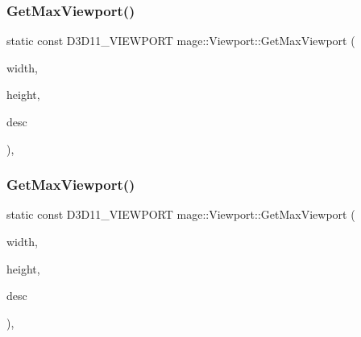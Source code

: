 \subsubsection{\texorpdfstring{Get\+Max\+Viewport()}{GetMaxViewport()}\hspace{0.1cm}{\footnotesize\ttfamily [4/5]}}
{\footnotesize\ttfamily static const D3\+D11\+\_\+\+V\+I\+E\+W\+P\+O\+RT mage\+::\+Viewport\+::\+Get\+Max\+Viewport (\begin{DoxyParamCaption}\item[{\hyperlink{namespacemage_a41c104c036fba3756a74e19f793eeaa1}{U32}}]{width,  }\item[{\hyperlink{namespacemage_a41c104c036fba3756a74e19f793eeaa1}{U32}}]{height,  }\item[{\hyperlink{namespacemage_a0b400065340fa5cca0ce4c2809d91af1}{A\+A\+Descriptor}}]{desc }\end{DoxyParamCaption})\hspace{0.3cm}{\ttfamily [static]}, {\ttfamily [noexcept]}}

\hypertarget{classmage_1_1_viewport_aa217e71e22be17179f6e1e9e18b30b77}{}\label{classmage_1_1_viewport_aa217e71e22be17179f6e1e9e18b30b77} 
\subsubsection{\texorpdfstring{Get\+Max\+Viewport()}{GetMaxViewport()}\hspace{0.1cm}{\footnotesize\ttfamily [5/5]}}
{\footnotesize\ttfamily static const D3\+D11\+\_\+\+V\+I\+E\+W\+P\+O\+RT mage\+::\+Viewport\+::\+Get\+Max\+Viewport (\begin{DoxyParamCaption}\item[{\hyperlink{namespacemage_aa97e833b45f06d60a0a9c4fc22ae02c0}{F32}}]{width,  }\item[{\hyperlink{namespacemage_aa97e833b45f06d60a0a9c4fc22ae02c0}{F32}}]{height,  }\item[{\hyperlink{namespacemage_a0b400065340fa5cca0ce4c2809d91af1}{A\+A\+Descriptor}}]{desc }\end{DoxyParamCaption})\hspace{0.3cm}{\ttfamily [static]}, {\ttfamily [noexcept]}}

\hypertarget{classmage_1_1_viewport_a27e673433e78f5382716e670b88d2bb1}{}\label{classmage_1_1_viewport_a27e673433e78f5382716e670b88d2bb1} 
